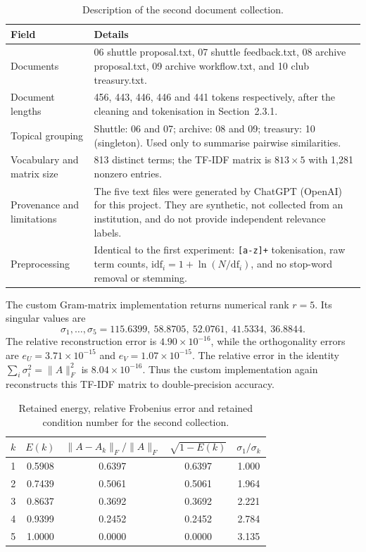 \documentclass[12pt,a4paper]{report}
\newcommand{\norm}[1]{\lVert #1\rVert}
\theoremstyle{plain}
\theoremstyle{definition}
\theoremstyle{remark}
\theoremstyle{definition}
\begin{document}
\begin{table}[H]
\centering
\caption{Description of the second document collection.}\label{tab:dataset2}
\begin{tabular}{@{}p{}p{}@{}}
\toprule
Field & Details\\
\midrule
Documents & 06 shuttle proposal.txt, 07 shuttle feedback.txt, 08 archive proposal.txt, 09 archive workflow.txt, and 10 club treasury.txt.\\
Document lengths & 456, 443, 446, 446 and 441 tokens respectively, after the cleaning and tokenisation in Section~2.3.1.\\
Topical grouping & Shuttle: 06 and 07; archive: 08 and 09; treasury: 10 (singleton). Used only to summarise pairwise similarities.\\
Vocabulary and matrix size & 813 distinct terms; the TF-IDF matrix is $813\times5$ with 1,281 nonzero entries.\\
Provenance and limitations & The five text files were generated by ChatGPT (OpenAI) for this project. They are synthetic, not collected from an institution, and do not provide independent relevance labels.\\
Preprocessing & Identical to the first experiment: \texttt{[a-z]+} tokenisation, raw term counts, $\mathrm{idf}_i=1+\ln(N/\mathrm{df}_i)$, and no stop-word removal or stemming.\\
\bottomrule
\end{tabular}
\end{table}

The custom Gram-matrix implementation returns numerical rank $r=5$. Its singular values are
\[
\sigma_1,\ldots,\sigma_5=115.6399,\ 58.8705,\ 52.0761,\ 41.5334,\ 36.8844.
\]
The relative reconstruction error is $4.90\times10^{-16}$, while the orthogonality errors are $e_U=3.71\times10^{-15}$ and $e_V=1.07\times10^{-15}$. The relative error in the identity $\sum_i\sigma_i^2=\norm{A}_F^2$ is $8.04\times10^{-16}$. Thus the custom implementation again reconstructs this TF-IDF matrix to double-precision accuracy.

\begin{table}[H]
\centering
\caption{Retained energy, relative Frobenius error and retained condition number for the second collection.}\label{tab:energy2}
\begin{tabular}{@{}ccccc@{}}
\toprule
$k$ & $E(k)$ & $\norm{A-A_k}_F/\norm{A}_F$ & $\sqrt{1-E(k)}$ & $\sigma_1/\sigma_k$\\
\midrule
1 & 0.5908 & 0.6397 & 0.6397 & 1.000\\
2 & 0.7439 & 0.5061 & 0.5061 & 1.964\\
3 & 0.8637 & 0.3692 & 0.3692 & 2.221\\
4 & 0.9399 & 0.2452 & 0.2452 & 2.784\\
5 & 1.0000 & 0.0000 & 0.0000 & 3.135\\
\bottomrule
\end{tabular}
\end{table}
\end{document}
